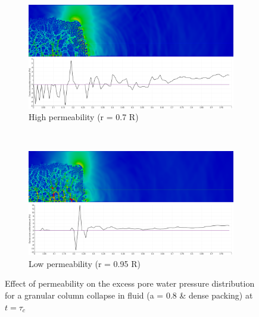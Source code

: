 \begin{figure}
\centering
\begin{subfigure}[t]{0.975\textwidth}
	\centering
    \includegraphics[width=\textwidth]{a08/r07_PWP_ini_dense}
    \caption{High permeability (r = 0.7 R)}
    \label{fig:r07_PWP_ini_dense}
\end{subfigure} \\
\begin{subfigure}[t]{0.975\textwidth}
	\centering
    \includegraphics[width=\textwidth]{a08/r095_PWP_ini_dense}
    \caption{Low permeability (r = 0.95 R)}
    \label{fig:r095_PWP_ini_dense}
\end{subfigure}
\caption{Effect of permeability on the excess pore water pressure distribution 
for a granular column collapse in fluid (a = 0.8 \& dense packing) at $t = 
\tau_c$}
\label{fig:PWP_ini_dense}
\end{figure}

